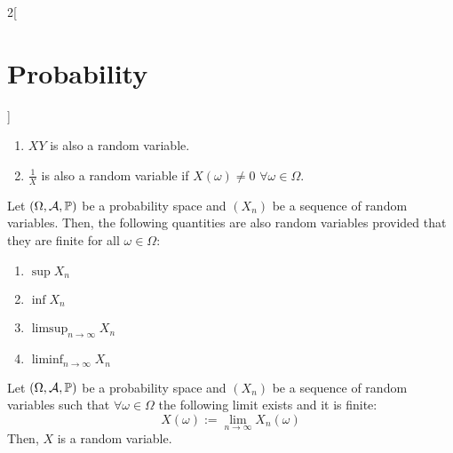 \documentclass[../../../main.tex]{subfiles}
\begin{document}
\begin{multicols}{2}[\section{Probability}]
\begin{prop}
\begin{enumerate}
            \item $XY$ is also a random variable.
            \item $\frac{1}{X}$ is also a random variable if $X(\omega)\ne 0$ $\forall \omega\in\Omega$.
        \end{enumerate}
    \end{prop}
    \begin{prop}
        Let $(\Omega,\mathcal{A},\mathbb{P})$ be a probability space and $(X_n)$ be a sequence of random variables. Then, the following quantities are also random variables provided that they are finite for all $\omega\in\Omega$:
        \begin{enumerate}
            \item $\sup X_n$
            \item $\inf X_n$
            \item $\displaystyle\limsup_{n\to\infty}X_n$
            \item $\displaystyle\liminf_{n\to\infty} X_n$
        \end{enumerate}
    \end{prop}
    \begin{corollary}
        Let $(\Omega,\mathcal{A},\mathbb{P})$ be a probability space and $(X_n)$ be a sequence of random variables such that $\forall\omega\in\Omega$ the following limit exists and it is finite: $$X(\omega):=\lim_{n\to\infty}X_n(\omega)$$
        Then, $X$ is a random variable.
    \end{corollary}

\end{multicols}
\end{document}
